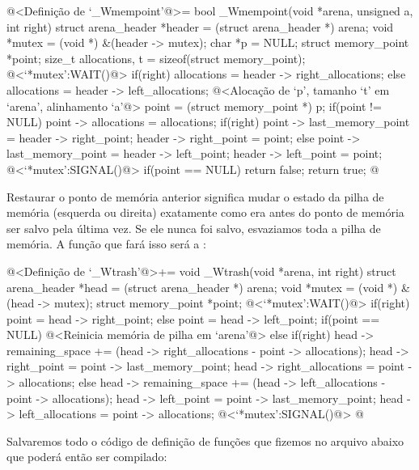 \iniciocodigo
@<Definição de `\_Wmempoint'@>=
bool _Wmempoint(void *arena, unsigned a, int right){
  struct arena_header *header = (struct arena_header *) arena;
  void *mutex = (void *) &(header -> mutex);
  char *p = NULL;
  struct memory_point *point;
  size_t allocations, t = sizeof(struct memory_point);
  @<`*mutex':WAIT()@>
  if(right)
    allocations = header -> right_allocations;
  else
    allocations = header -> left_allocations;
  @<Alocação de `p', tamanho `t' em `arena', alinhamento `a'@>
  point = (struct memory_point *) p;
  if(point != NULL){
    point -> allocations = allocations;
    if(right){
      point -> last_memory_point = header -> right_point;
      header -> right_point = point;
    }
    else{
      point -> last_memory_point = header -> left_point;
      header -> left_point = point;
    }
  }
  @<`*mutex':SIGNAL()@>
  if(point == NULL)
    return false;
  return true;
}
@
\fimcodigo


Restaurar o ponto de memória anterior significa mudar o estado da
pilha de memória (esquerda ou direita) exatamente como era antes do
ponto de memória ser salvo pela última vez. Se ele nunca foi salvo,
esvaziamos toda a pilha de memória. A função que fará isso será
a :

\iniciocodigo
@<Definição de `\_Wtrash'@>+=
void _Wtrash(void *arena, int right){
  struct arena_header *head = (struct arena_header *) arena;
  void *mutex = (void *) &(head -> mutex);
  struct memory_point *point;
  @<`*mutex':WAIT()@>
  if(right){
    point = head -> right_point;
  }
  else{
    point = head -> left_point;
  }
  if(point == NULL){
    @<Reinicia memória de pilha em `arena'@>
  }
  else{
    if(right){
      head -> remaining_space += (head -> right_allocations -
                                  point -> allocations);
      head -> right_point = point -> last_memory_point;
      head -> right_allocations = point -> allocations;
    }
    else{
      head -> remaining_space += (head -> left_allocations -
                                  point -> allocations);
      head -> left_point = point -> last_memory_point;
      head -> left_allocations = point -> allocations;
    }
  }
  @<`*mutex':SIGNAL()@>
}
@
\fimcodigo



Salvaremos todo o código de definição de funções que fizemos no
arquivo abaixo que poderá então ser compilado:

